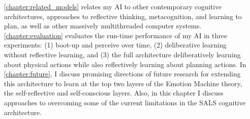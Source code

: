{\mbox{\autoref{chapter:related_models}}} relates my AI to other
contemporary cognitive architectures, approaches to reflective
thinking, metacognition, and learning to plan, as well as other
massively multithreaded computer systems.
{\mbox{\autoref{chapter:evaluation}}} evaluates the run-time
performance of my AI in three experiments: (1) boot-up and perceive
over time, (2) deliberative learning without reflective learning, and
(3) the full architecture deliberatively learning about physical
actions while also reflectively learning about planning actions.  In
{\mbox{\autoref{chapter:future}}}, I discuss promising directions of
future research for extending this architecture to learn at the top
two layers of the Emotion Machine theory, the self-reflective and
self-conscious layers.  Also, in this chapter I discuss approaches to
overcoming some of the current limitations in the SALS cognitive
architecture.

